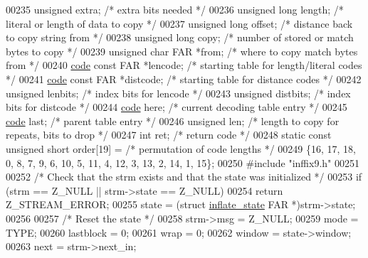\begin{DoxyCode}
{{{{00235     \textcolor{keywordtype}{unsigned} extra;             \textcolor{comment}{/* extra bits needed */}
00236     \textcolor{keywordtype}{unsigned} \textcolor{keywordtype}{long} length;       \textcolor{comment}{/* literal or length of data to copy */}
00237     \textcolor{keywordtype}{unsigned} \textcolor{keywordtype}{long} offset;       \textcolor{comment}{/* distance back to copy string from */}
00238     \textcolor{keywordtype}{unsigned} \textcolor{keywordtype}{long} copy;         \textcolor{comment}{/* number of stored or match bytes to copy */}
00239     \textcolor{keywordtype}{unsigned} \textcolor{keywordtype}{char} FAR *from;    \textcolor{comment}{/* where to copy match bytes from */}
00240     \hyperlink{structcode}{code} \textcolor{keyword}{const} FAR *lencode;    \textcolor{comment}{/* starting table for length/literal codes */}
00241     \hyperlink{structcode}{code} \textcolor{keyword}{const} FAR *distcode;   \textcolor{comment}{/* starting table for distance codes */}
00242     \textcolor{keywordtype}{unsigned} lenbits;           \textcolor{comment}{/* index bits for lencode */}
00243     \textcolor{keywordtype}{unsigned} distbits;          \textcolor{comment}{/* index bits for distcode */}
00244     \hyperlink{structcode}{code} here;                  \textcolor{comment}{/* current decoding table entry */}
00245     \hyperlink{structcode}{code} last;                  \textcolor{comment}{/* parent table entry */}
00246     \textcolor{keywordtype}{unsigned} len;               \textcolor{comment}{/* length to copy for repeats, bits to drop */}
00247     \textcolor{keywordtype}{int} ret;                    \textcolor{comment}{/* return code */}
00248     \textcolor{keyword}{static} \textcolor{keyword}{const} \textcolor{keywordtype}{unsigned} \textcolor{keywordtype}{short} order[19] = \textcolor{comment}{/* permutation of code lengths */}
00249         \{16, 17, 18, 0, 8, 7, 9, 6, 10, 5, 11, 4, 12, 3, 13, 2, 14, 1, 15\};
00250 \textcolor{preprocessor}{#include "inffix9.h"}
00251 
00252     \textcolor{comment}{/* Check that the strm exists and that the state was initialized */}
00253     \textcolor{keywordflow}{if} (strm == Z\_NULL || strm->state == Z\_NULL)
00254         \textcolor{keywordflow}{return} Z\_STREAM\_ERROR;
00255     state = (\textcolor{keyword}{struct }\hyperlink{structinflate__state}{inflate\_state} FAR *)strm->state;
00256 
00257     \textcolor{comment}{/* Reset the state */}
00258     strm->msg = Z\_NULL;
00259     mode = TYPE;
00260     lastblock = 0;
00261     wrap = 0;
00262     window = state->window;
00263     next = strm->next\_in;
}}}}
\end{DoxyCode}
